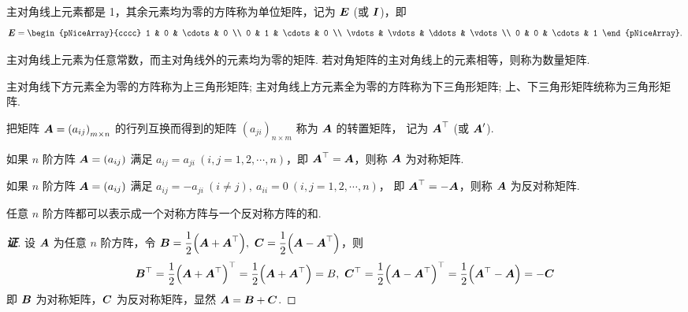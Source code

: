 \begin{definition}[单位矩阵]
    主对角线上元素都是 1，其余元素均为零的方阵称为单位矩阵，记为 $ \vb*{E}$ (或 $ \vb*{I} $)，即
    $$\vb*{E}=\begin{pNiceArray}{cccc}
            1      & 0      & \cdots & 0      \\
            0      & 1      & \cdots & 0      \\
            \vdots & \vdots & \ddots & \vdots \\
            0      & 0      & \cdots & 1
        \end{pNiceArray} .$$
\end{definition}

\begin{definition}[数量矩阵]
    主对角线上元素为任意常数，而主对角线外的元素均为零的矩阵. 若对角矩阵的主对角线上的元素相等，则称为数量矩阵.
\end{definition}

\begin{definition}[三角形矩阵]
    主对角线下方元素全为零的方阵称为上三角形矩阵; 主对角线上方元素全为零的方阵称为下三角形矩阵; 上、下三角形矩阵统称为三角形矩阵.
\end{definition}

\begin{definition}[矩阵的转置]
    把矩阵 $ \vb*{A}=\left(a_{i j}\right)_{m \times n} $ 的行列互换而得到的矩阵 $ \left(a_{j i}\right)_{n \times m} $ 称为 $ \vb*{A} $ 的转置矩阵，
    记为 $ \vb*{A}^{\top} $ (或 $ \vb*{A}^{\prime} $).
\end{definition}

\begin{definition}[对称矩阵]
    如果 $ n $ 阶方阵 $ \vb*{A}=\left(a_{i j}\right) $ 满足 $ a_{i j}=a_{j i}~ (i, j=1,2, \cdots, n) $，即 $ \vb*{A}^{\top}=\vb*{A} $，则称 $ \vb*{A} $ 为对称矩阵.
\end{definition}
\begin{definition}[反对称矩阵]
    如果 $ n $ 阶方阵 $ \vb*{A}=\left(a_{i j}\right) $ 满足 $ a_{i j}=-a_{j i}~ (i \neq j),~a_{i i}=0~ (i, j=1,2, \cdots ,  n) $，
    即 $ \vb*{A}^{\top}=-\vb*{A} $，则称 $ \vb*{A} $ 为反对称矩阵.
\end{definition}
\begin{theorem}[方阵的对称表达]
    任意 $n$ 阶方阵都可以表示成一个对称方阵与一个反对称方阵的和.
\end{theorem}
\begin{proof}[{\songti \textbf{证}}]
    设 $\vb*{A}$ 为任意 $n$ 阶方阵，令 $\vb*{B}=\dfrac{1}{2}\qty(\vb*{A}+\vb*{A}^{\top}),~\vb*{C}=\dfrac{1}{2}\qty(\vb*{A}-\vb*{A}^{\top})$，则 
    $$\vb*{B}^\top=\dfrac{1}{2}\qty(\vb*{A}+\vb*{A}^{\top})^\top=\dfrac{1}{2}\qty(\vb*{A}+\vb*{A}^{\top})=B,~
    \vb*{C}^\top=\dfrac{1}{2}\qty(\vb*{A}-\vb*{A}^{\top})^\top=\dfrac{1}{2}\qty(\vb*{A}^\top-\vb*{A})=-\vb*{C}$$
    即 $\vb*{B}$ 为对称矩阵，$\vb*{C}$ 为反对称矩阵，显然 $\vb*{A}=\vb*{B}+\vb*{C}$.
\end{proof}

